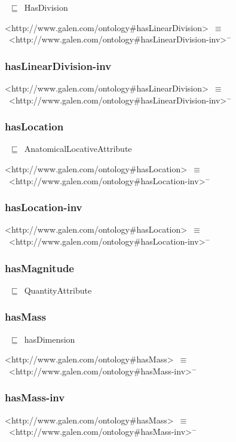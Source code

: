 \documentclass{article}
\begin{document}
~\ensuremath{\sqsubseteq}~HasDivision

<http://www.galen.com/ontology#hasLinearDivision>~\ensuremath{\equiv}~<http://www.galen.com/ontology#hasLinearDivision-inv>\ensuremath{^-}

\subsubsection*{hasLinearDivision-inv}

<http://www.galen.com/ontology#hasLinearDivision>~\ensuremath{\equiv}~<http://www.galen.com/ontology#hasLinearDivision-inv>\ensuremath{^-}

\subsubsection*{hasLocation}

~\ensuremath{\sqsubseteq}~AnatomicalLocativeAttribute

<http://www.galen.com/ontology#hasLocation>~\ensuremath{\equiv}~<http://www.galen.com/ontology#hasLocation-inv>\ensuremath{^-}

\subsubsection*{hasLocation-inv}

<http://www.galen.com/ontology#hasLocation>~\ensuremath{\equiv}~<http://www.galen.com/ontology#hasLocation-inv>\ensuremath{^-}

\subsubsection*{hasMagnitude}

~\ensuremath{\sqsubseteq}~QuantityAttribute

\subsubsection*{hasMass}

~\ensuremath{\sqsubseteq}~hasDimension

<http://www.galen.com/ontology#hasMass>~\ensuremath{\equiv}~<http://www.galen.com/ontology#hasMass-inv>\ensuremath{^-}

\subsubsection*{hasMass-inv}

<http://www.galen.com/ontology#hasMass>~\ensuremath{\equiv}~<http://www.galen.com/ontology#hasMass-inv>\ensuremath{^-}
\end{document}
